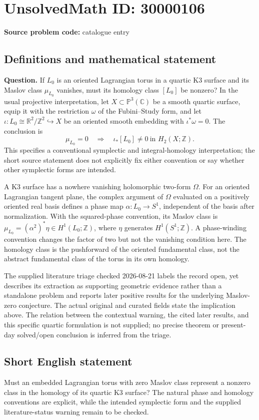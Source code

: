 \documentclass[11pt]{article}
\newcommand{\Z}{\mathbb{Z}}
\newcommand{\R}{\mathbb{R}}
\newcommand{\C}{\mathbb{C}}
\newcommand{\PP}{\mathbb{P}}
\begin{document}
\section*{UnsolvedMath ID: 30000106}
\textbf{Source problem code:} catalogue entry
\subsection{Definitions and mathematical statement}
\textbf{Question.} If \(L_0\) is an oriented Lagrangian torus in a quartic K3 surface and its Maslov class \(\mu_{L_0}\) vanishes, must its homology class \([L_0]\) be nonzero? In the usual projective interpretation, let \(X\subset\PP^3(\C)\) be a smooth quartic surface, equip it with the restriction \(\omega\) of the Fubini--Study form, and let \(\iota:L_0\cong\R^2/\Z^2\hookrightarrow X\) be an oriented smooth embedding with \(\iota^*\omega=0\). The conclusion is\[\mu_{L_0}=0\quad\Longrightarrow\quad\iota_*[L_0]\ne0\ \text{in }H_2(X;\Z).\] This specifies a conventional symplectic and integral-homology interpretation; the short source statement does not explicitly fix either convention or say whether other symplectic forms are intended.\par A K3 surface has a nowhere vanishing holomorphic two-form \(\Omega\). For an oriented Lagrangian tangent plane, the complex argument of \(\Omega\) evaluated on a positively oriented real basis defines a phase map \(\alpha:L_0\to S^1\), independent of the basis after normalization. With the squared-phase convention, its Maslov class is \(\mu_{L_0}=(\alpha^2)^*\eta\in H^1(L_0;\Z)\), where \(\eta\) generates \(H^1(S^1;\Z)\). A phase-winding convention changes the factor of two but not the vanishing condition here. The homology class is the pushforward of the oriented fundamental class, not the abstract fundamental class of the torus in its own homology.\par The supplied literature triage checked 2026-08-21 labels the record open, yet describes its extraction as supporting geometric evidence rather than a standalone problem and reports later positive results for the underlying Maslov-zero conjecture. The actual original and curated fields state the implication above. The relation between the contextual warning, the cited later results, and this specific quartic formulation is not supplied; no precise theorem or present-day solved/open conclusion is inferred from the triage.
\subsection{Short English statement}
Must an embedded Lagrangian torus with zero Maslov class represent a nonzero class in the homology of its quartic K3 surface? The natural phase and homology conventions are explicit, while the intended symplectic form and the supplied literature-status warning remain to be checked.
\end{document}
